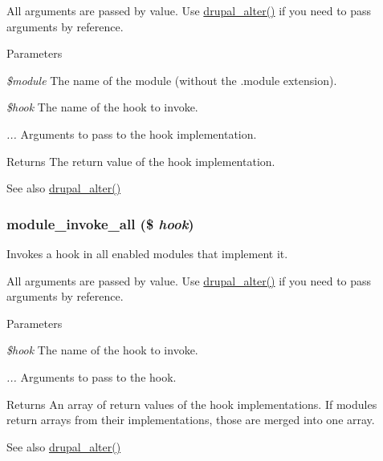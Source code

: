 All arguments are passed by value. Use \hyperlink{module_8inc_a0a8742a524bbb674b6c6a26755765007}{drupal\_\-alter()} if you need to pass arguments by reference.


\begin{DoxyParams}{Parameters}
\item[{\em \$module}]The name of the module (without the .module extension). \item[{\em \$hook}]The name of the hook to invoke. \item[{\em ...}]Arguments to pass to the hook implementation.\end{DoxyParams}
\begin{DoxyReturn}{Returns}
The return value of the hook implementation.
\end{DoxyReturn}
\begin{DoxySeeAlso}{See also}
\hyperlink{module_8inc_a0a8742a524bbb674b6c6a26755765007}{drupal\_\-alter()} 
\end{DoxySeeAlso}
\hypertarget{group__hooks_gabedb5f566ef5faaa5768dd15125b111c}{
\subsubsection[{module\_\-invoke\_\-all}]{\setlength{\rightskip}{0pt plus 5cm}module\_\-invoke\_\-all (\$ {\em hook})}}
\label{group__hooks_gabedb5f566ef5faaa5768dd15125b111c}
Invokes a hook in all enabled modules that implement it.

All arguments are passed by value. Use \hyperlink{module_8inc_a0a8742a524bbb674b6c6a26755765007}{drupal\_\-alter()} if you need to pass arguments by reference.


\begin{DoxyParams}{Parameters}
\item[{\em \$hook}]The name of the hook to invoke. \item[{\em ...}]Arguments to pass to the hook.\end{DoxyParams}
\begin{DoxyReturn}{Returns}
An array of return values of the hook implementations. If modules return arrays from their implementations, those are merged into one array.
\end{DoxyReturn}
\begin{DoxySeeAlso}{See also}
\hyperlink{module_8inc_a0a8742a524bbb674b6c6a26755765007}{drupal\_\-alter()} 
\end{DoxySeeAlso}

